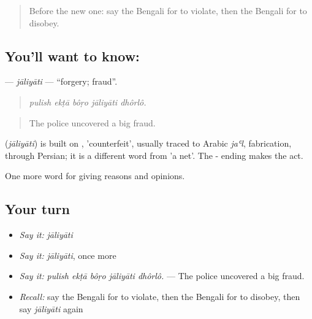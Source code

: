 \label{lesson:BN-C341-jaliyati}



\begin{quote}
Before the new one: say the Bengali for to violate, then the Bengali for to disobey.
\end{quote}

\subsection*{You'll want to know: }
\textbf{} — \emph{jāliyāti} — \textquotedblleft{}forgery; fraud\textquotedblright{}.

\begin{quote}
    
\end{quote}

\begin{quote}
\emph{pulish ekṭā bôṛo jāliyāti dhôrlô.}
\end{quote}

\begin{quote}
The police uncovered a big fraud.
\end{quote}

\begin{cousinweb}
\textbf{} (\emph{jāliyāti}) is built on , 'counterfeit', usually traced to Arabic \emph{jaʿl}, fabrication, through Persian; it is a different word from  'a net'. The - ending makes the act.
\end{cousinweb}

\begin{grammarlens}[title={What you've built}]
One more word for giving reasons and opinions.
\end{grammarlens}

\subsection*{Your turn}
\begin{itemize}
\raggedright
  \item \emph{Say it:} \emph{jāliyāti}
  \item \emph{Say it:} \emph{jāliyāti}, once more
  \item \emph{Say it:} \emph{pulish ekṭā bôṛo jāliyāti dhôrlô.} — The police uncovered a big fraud.
  \item \emph{Recall:} say the Bengali for to violate, then the Bengali for to disobey, then say \emph{jāliyāti} again
\end{itemize}

